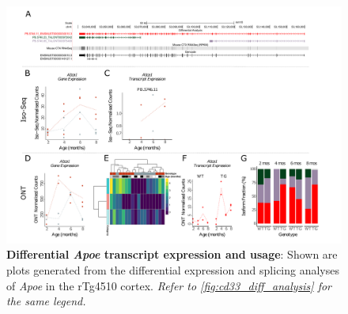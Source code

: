 \begin{landscape}
	\begin{figure}[htp]
		\begin{center}
			\includegraphics[page=4,trim={0 0.5cm 0 1.5cm},scale =0.85]{Figures/TargetGene_DifferentialAnalysis.pdf}
		\end{center}
		\captionsetup{width=1.5\textwidth}
		\caption[Differential \textit{Apoe} transcript expression and usage]%
		{\textbf{Differential \textit{Apoe} transcript expression and usage}: Shown are plots generated from the differential expression and splicing analyses of \textit{Apoe} in the rTg4510 cortex. \textit{Refer to \cref{fig:cd33_diff_analysis} for the same legend.}}   
		\label{fig:Apoe_diff_analysis}
	\end{figure}
\end{landscape}

